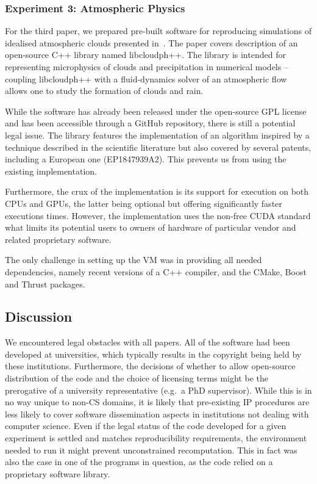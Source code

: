 \subsubsection*{Experiment 3: Atmospheric Physics}

For the third paper, we prepared pre-built software for reproducing 
  simulations of idealised atmospheric clouds presented in~\cite{arabas2013libcloud}.
The paper covers description of an open-source C++ library named libcloudph++. 
The library is intended for representing microphysics of clouds and precipitation
  in numerical models -- coupling libcloudph++ with a fluid-dynamics solver 
  of an atmospheric flow allows one to study the formation of clouds and rain.

While the software has already been released under the open-source GPL license
  and has been accessible through a GitHub repository, there is still
  a potential legal issue.
The library features the implementation of an algorithm inspired by a technique 
  described in the scientific literature but also covered by several patents,
  including a European one (EP1847939A2). This prevents us from using the
  existing implementation.

Furthermore, the crux of the implementation is its support for execution
  on both CPUs and GPUs, the latter being optional but offering 
  significantly faster executions times.
However, the implementation uses the non-free CUDA standard what limits its potential
  users to owners of hardware of particular vendor and related proprietary software.

The only challenge in setting up the VM was in providing all needed
  dependencies, namely recent versions of a C++ compiler, and the CMake, Boost and Thrust 
  packages.

\subsection{Discussion}

We encountered legal obstacles with all papers.
All of the software had been developed at universities, which typically results in the copyright being held by these institutions.
Furthermore, the decisions of whether to allow open-source distribution of the
code and the choice of licensing terms might be the prerogative of a university
representative (e.g.\ a PhD supervisor).
While this is in no way unique to non-CS domains, it is likely that pre-existing IP procedures are less likely to cover software dissemination aspects in institutions not dealing with computer science.
Even if the legal status of the code developed for a given experiment is settled and matches reproducibility requirements, the environment needed to run it might prevent unconstrained recomputation.
This in fact was also the case in one of the programs in question, as the code relied on a proprietary software library.

